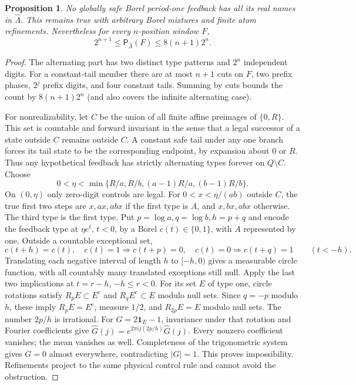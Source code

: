 \documentclass[11pt,reqno]{amsart}
\numberwithin{equation}{section}
\newtheorem{proposition}[theorem]{Proposition}
\theoremstyle{definition}
\newcommand{\Patt}{\mathsf P}
\newcommand{\one}{\mathbf 1}
\begin{document}
\begin{proposition}\label{prop:alternation}
No globally safe Borel period-one feedback has all its real names
in $\widehat\Lambda$. This remains true with arbitrary Borel
mixtures and finite atom refinements. Nevertheless for every
$n$-position window $F$,
\[
 2^{n+1}\le\Patt_{\widehat\Lambda}(F)\le8(n+1)2^n.
\]
\end{proposition}
\begin{proof}
The alternating part has two distinct type patterns and $2^n$
independent digits. For a constant-tail member there are at most
$n+1$ cuts on $F$, two prefix phases, $2^j$ prefix digits, and
four constant tails. Summing by cuts bounds the count by
$8(n+1)2^n$ (and also covers the infinite alternating case).

For nonrealizability, let $C$ be the union of all finite affine
preimages of $\{0,R\}$. This set is countable and forward
invariant in the sense that a legal successor of a state outside
$C$ remains outside $C$. A constant safe tail under any one
branch forces its tail state to be the corresponding endpoint,
by expansion about $0$ or $R$. Thus any hypothetical feedback
has strictly alternating types forever on $Q\setminus C$.
Choose
\[
 0<\eta<\min\{R/a,R/b,(a-1)R/a,(b-1)R/b\}.
\]
On $(0,\eta)$ only zero-digit controls are legal. For
$0<x<\eta/(ab)$ outside $C$, the true first two steps are
$x,ax,abx$ if the first type is $A$, and $x,bx,abx$ otherwise.
The third type is the first type. Put $p=\log a,q=\log b,h=p+q$
and encode the feedback type at $\eta e^t$, $t<0$, by a Borel
$c(t)\in\{0,1\}$, with $A$ represented by one. Outside a
countable exceptional set,
\[
 c(t+h)=c(t),\quad
 c(t)=1\Rightarrow c(t+p)=0,\quad
 c(t)=0\Rightarrow c(t+q)=1\qquad(t<-h).
\]
Translating each negative interval of length $h$ to $[-h,0)$
gives a measurable circle function, with all countably many
translated exceptions still null. Apply the last two implications
at $t=r-h$, $-h\le r<0$. For its set $E$ of type one, circle
rotations satisfy $R_pE\subset E^c$ and $R_qE^c\subset E$
modulo null sets. Since $q=-p$ modulo $h$, these imply
$R_pE=E^c$, measure $1/2$, and $R_{2p}E=E$ modulo null sets.
The number $2p/h$ is irrational. For
$G=2\one_E-1$, invariance under that rotation and Fourier
coefficients give
$\widehat G(j)=e^{2\pi i j(2p/h)}\widehat G(j)$.
Every nonzero coefficient vanishes; the mean vanishes as well.
Completeness of the trigonometric system gives $G=0$ almost
everywhere, contradicting $|G|=1$. This proves impossibility.
Refinements project to the same physical control rule and cannot
avoid the obstruction.
\end{proof}
\end{document}
